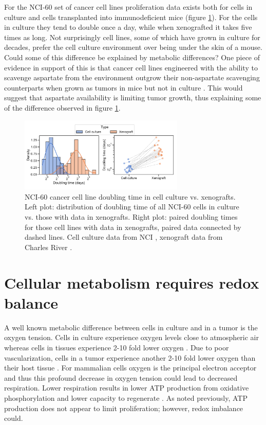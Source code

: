 For the NCI-60 set of cancer cell lines proliferation data exists both for cells in culture and cells transplanted into immunodeficient mice (figure \ref{fig:ch1:prlfr_contr}).
For the cells in culture they tend to double once a day, while when xenografted it takes five times as long.
Not surprisingly cell lines, some of which have grown in culture for decades, prefer the cell culture environment over being under the skin of a mouse.
Could some of this difference be explained by metabolic differences?
One piece of evidence in support of this is that cancer cell lines engineered with the ability to scavenge aspartate from the environment outgrow their non-aspartate scavenging counterparts when grown as tumors in mice but not in culture \cite{Sullivan2018-gz, Garcia-Bermudez2018-mj}.
This would suggest that aspartate availability is limiting tumor growth, thus explaining some of the difference observed in figure \ref{fig:ch1:prlfr_contr}.

\begin{figure}
    \centering
    \includegraphics[width=0.70\textwidth]{figures/chap1/prlfr_contr.pdf}
    \caption[NCI-60 cancer cell line doubling time in cell culture vs. xenografts.]{
    NCI-60 cancer cell line doubling time in cell culture vs. xenografts.
    Left plot: distribution of doubling time of all NCI-60 cells in culture vs. those with data in xenografts.
    Right plot: paired doubling times for those cell lines with data in xenografts, paired data connected by dashed lines.
    Cell culture data from NCI \cite{NCI60}, xenograft data from Charles River \cite{CR_tumor}.
    }
    \label{fig:ch1:prlfr_contr}
\end{figure}




\section{Cellular metabolism requires redox balance}
A well known metabolic difference between cells in culture and in a tumor is the oxygen tension.
Cells in culture experience oxygen levels close to atmospheric air whereas cells in tissues experience 2-10 fold lower oxygen \cite{Ast2019-hh}.
Due to poor vascularization, cells in a tumor experience another 2-10 fold lower oxygen than their host tissue \cite{McKeown2014-tt}.
For mammalian cells oxygen is the principal electron acceptor and thus this profound decrease in oxygen tension could lead to decreased respiration.
Lower respiration results in lower ATP production from oxidative phosphorylation and lower capacity to regenerate \NAD.
As noted previously, ATP production does not appear to limit proliferation; however, redox imbalance could. 

